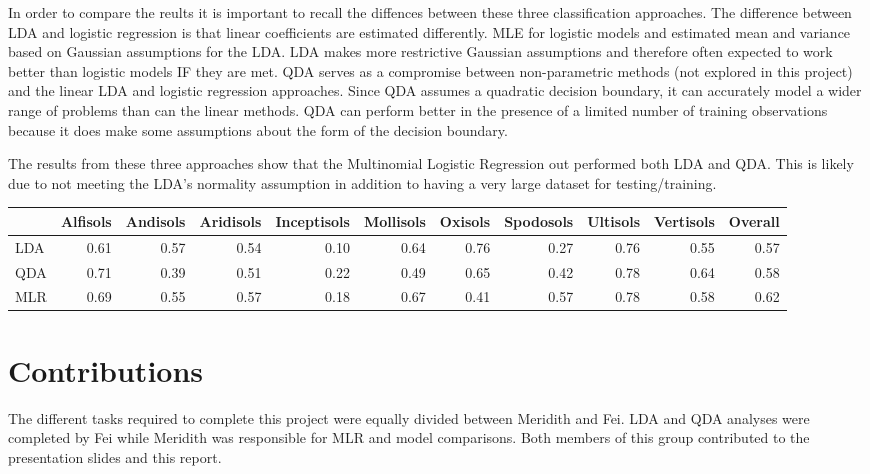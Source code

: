 \documentclass[]{article}
\begin{document}
In order to compare the reults it is important to recall the diffences
between these three classification approaches. The difference between
LDA and logistic regression is that linear coefficients are estimated
differently. MLE for logistic models and estimated mean and variance
based on Gaussian assumptions for the LDA. LDA makes more restrictive
Gaussian assumptions and therefore often expected to work better than
logistic models IF they are met. QDA serves as a compromise between
non-parametric methods (not explored in this project) and the linear LDA
and logistic regression approaches. Since QDA assumes a quadratic
decision boundary, it can accurately model a wider range of problems
than can the linear methods. QDA can perform better in the presence of a
limited number of training observations because it does make some
assumptions about the form of the decision boundary.

The results from these three approaches show that the Multinomial
Logistic Regression out performed both LDA and QDA. This is likely due
to not meeting the LDA's normality assumption in addition to having a
very large dataset for testing/training.

\begin{longtable}[]{@{}lrrrrrrrrrr@{}}
\toprule
& Alfisols & Andisols & Aridisols & Inceptisols & Mollisols & Oxisols &
Spodosols & Ultisols & Vertisols & Overall\tabularnewline
\midrule
\endhead
LDA & 0.61 & 0.57 & 0.54 & 0.10 & 0.64 & 0.76 & 0.27 & 0.76 & 0.55 &
0.57\tabularnewline
QDA & 0.71 & 0.39 & 0.51 & 0.22 & 0.49 & 0.65 & 0.42 & 0.78 & 0.64 &
0.58\tabularnewline
MLR & 0.69 & 0.55 & 0.57 & 0.18 & 0.67 & 0.41 & 0.57 & 0.78 & 0.58 &
0.62\tabularnewline
\bottomrule
\end{longtable}

\section{Contributions}\label{contributions}

The different tasks required to complete this project were equally
divided between Meridith and Fei. LDA and QDA analyses were completed by
Fei while Meridith was responsible for MLR and model comparisons. Both
members of this group contributed to the presentation slides and this
report.
\end{document}
